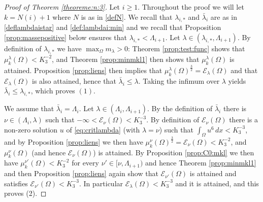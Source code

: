\documentclass[10pt]{amsart}
\numberwithin{equation}{section}
\newcommand{\Om}{\Omega}
\newcommand{\mkl}{\mu_{k}^{\lambda}}
\theoremstyle{plain}
\theoremstyle{remark}
\begin{document}
\begin{proof}[Proof of Theorem \ref{theoreme:n:3}] Let $i \ge 1$. Throughout the proof we will let $k = N(i) +1$ where $N$ is as in \eqref{defN}. We recall that $\lambda_{i,*}$ and $\bar{\lambda}_i$ are as in \eqref{deflambdaistar} and  \eqref{def:lambdai:min} and we recall that Proposition \ref{prop:massepositive} below ensures that $\lambda_{i,*} < \Lambda_{i+1}$. Let $\lambda \in (\lambda_{i,*}, \Lambda_{i+1})$. By definition of $\lambda_{i,*}$ we have $\max_{\Om} m_\lambda >0$: Theorem \ref{prop:test:func} shows that $\mu_k^{\lambda}(\Om) < K_3^{-2}$, and Theorem \ref{prop:minmkl1} then shows that $\mu_k^{\lambda}(\Om)$ is attained. Proposition \ref{prop:liens}  then implies that $\mkl(\Om)^{\frac32} = \mathcal{E}_{\lambda}(\Om)$ and that $\mathcal{E}_\lambda(\Om)$ is also attained, hence that $\bar{\lambda}_i \le \lambda$. Taking the infimum over $\lambda$ yields $\bar{\lambda}_i \le \lambda_{i,*}$, which proves $(1)$.

We assume that $\bar{\lambda}_i = \Lambda_i$. Let $\lambda \in (\Lambda_i, \Lambda_{i+1})$. By the definition of $\bar{\lambda}_i$ there is $\nu \in (\Lambda_i, \lambda)$ such that $- \infty < \mathcal{E}_\nu(\Om) < K_3^{-3}$. By definition of $\mathcal{E}_\nu(\Om)$ there is a non-zero solution $u$ of \eqref{eq:critlambda} (with $\lambda = \nu$) such that $\int_{\Om} u^6 \,dx < K_3^{-3}$, and by Proposition \ref{prop:liens} we then have $\mu_k^{\nu}(\Om)^{\frac32} =  \mathcal{E}_\nu(\Om)< K_3^{-2}$, and $\mu_k^{\nu}(\Om)$ (and hence $\mathcal{E}_\nu(\Om)$) is attained. By Proposition \ref{prop:C0:mkl} we then have $\mu_k^{\nu'}(\Om) < K_3^{-2}$ for every $\nu' \in [\nu, \Lambda_{i+1})$ and hence Theorem \ref{prop:minmkl1} and then Proposition \ref{prop:liens} again show that $\mathcal{E}_{\nu'}(\Om)$ is attained and satisfies $\mathcal{E}_{\nu'}(\Om) < K_3^{-3}$. In particular $\mathcal{E}_\lambda(\Om) <K_3^{-3}$ and it is attained, and this proves (2). 



\end{proof}
\end{document}
